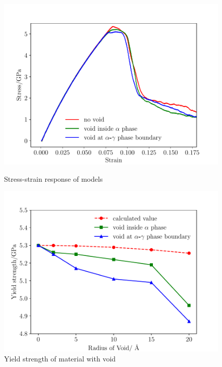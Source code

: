 \documentclass[Unknown,article,submit,moreauthors,pdftex,10pt,a4paper]{Definitions/mdpi}
\begin{document}
\begin{figure}[ht]
	\centering
	\begin{minipage}{0.495\textwidth}
		\includegraphics[width=1\linewidth]{img/allline}
		\centering
		\caption{Stress-strain response of models}
		\label{fig:stress&strain}
	\end{minipage}	
	\hfill
	\begin{minipage}{0.495\textwidth}		
		\includegraphics[width=1\linewidth]{img/effect_of_vol}
		\centering
		\caption{Yield strength of material with void}
		\label{fig:strength}
	\end{minipage}
\end{figure}


	
\end{document}
